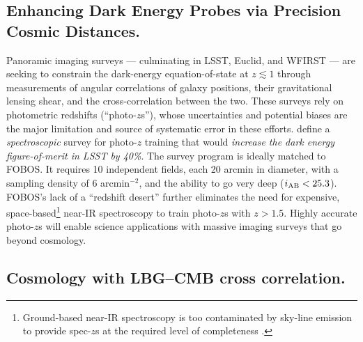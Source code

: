 
\subsection{Enhancing Dark Energy Probes via Precision Cosmic Distances.}
\label{sec:cosmology}

Panoramic imaging surveys --- culminating in LSST, Euclid, and WFIRST --- are seeking to constrain the dark-energy
equation-of-state at $z \lesssim 1$ through measurements of angular correlations of galaxy positions, their
gravitational lensing shear, and the cross-correlation between the two.  These surveys rely on photometric redshifts
(``photo-$z$s''), whose uncertainties and potential biases are the major limitation and source of systematic error in
these efforts.  \citet{newman15} define a \emph{spectroscopic} survey for photo-$z$ training that would \emph{increase
the dark energy figure-of-merit in LSST by 40\%}.  The survey program is ideally matched to FOBOS.  It requires 10
independent fields, each 20 arcmin in diameter, with a sampling density of 6 arcmin$^{-2}$, and the ability to go very
deep ($i_{\rm AB} < 25.3$).  FOBOS's lack of a ``redshift desert'' further eliminates the need for expensive, space-based\footnote{Ground-based near-IR spectroscopy is too contaminated by
sky-line emission to provide spec-$z$s at the required level of completeness \citep{newman15}.} near-IR spectroscopy to train photo-$z$s with $z > 1.5$.  Highly accurate photo-$z$s will enable science applications with massive imaging surveys that go beyond cosmology.

\subsection{Cosmology with LBG--CMB cross correlation.}
\label{sec:LBG}

